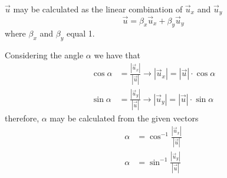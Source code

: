 \documentclass{article}
\begin{document}
$\vec{u}$ may be calculated as the linear combination of $\vec{u}_x$ and $\vec{u}_y$
\[
	\vec{u} = \beta_x \vec{u}_x + \beta_y \vec{u}_y
\]
where $\beta_x$ and $\beta_y$ equal 1.

Considering the angle $\alpha$ we have that
\begin{equation*}
	\begin{aligned}
		\cos \alpha &= \frac{|\vec{u}_x|}{|\vec{u}|} \to |\vec{u}_x| = |\vec{u}| \cdot \cos \alpha
		\\ 
		\sin \alpha &= \frac{|\vec{u}_y|}{|\vec{u}|} \to |\vec{u}_y| = |\vec{u}| \cdot \sin \alpha
	\end{aligned}
\end{equation*}
therefore, $\alpha$ may be calculated from the given vectors
\begin{equation*}
	\begin{aligned}
		\alpha &= \cos^{-1}\frac{|\vec{u}_x|}{|\vec{u}|} \\
		\alpha &= \sin^{-1}\frac{|\vec{u}_y|}{|\vec{u}|}
	\end{aligned}
\end{equation*}
\end{document}
